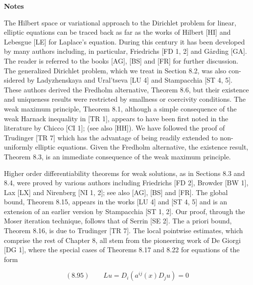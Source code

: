 \noindent \textbf{Notes}

\medskip

The Hilbert space or variational approach to the Dirichlet problem for linear,
elliptic equations can be traced back as far as the works of Hilbert [HI] and
Lebesgue [LE] for Laplace's equation. During this century it has been developed
by many authors including, in particular, Friedrichs [FD 1, 2] and G\aa rding [GA].
The reader is referred to the books [AG], [BS] and [FR] for further discussion.
The generalized Dirichlet problem, which we treat in Section 8.2, was also con-
sidered by Ladyzhenskaya and Ural'tseva [LU 4] and Stampacchia [ST 4, 5].
These authors derived the Fredholm alternative, Theorem 8.6, but their existence
and uniqueness results were restricted by smallness or coercivity conditions. The
weak maximum principle, Theorem 8.1, although a simple consequence of the
weak Harnack inequality in [TR 1], appears to have been first noted in the
literature by Chicco [CI 1]; (see also [HH]). We have followed the proof of
Trudinger [TR 7] which has the advantage of being readily extended to non-
uniformly elliptic equations. Given the Fredholm alternative, the existence result,
Theorem 8.3, is an immediate consequence of the weak maximum principle.



Higher order differentiability theorems for weak solutions, as in Sections 8.3
and 8.4, were proved by various authors including Friedrichs [FD 2], Browder
[BW 1], Lax [LX] and Nirenberg [NI 1, 2]; see also [AG], [BS] and [FR].
The global bound, Theorem 8.15, appears in the works [LU 4] and [ST 4, 5]
and is an extension of an earlier version by Stampacchia [ST 1, 2]. Our proof,
through the Moser iteration technique, follows that of Serrin [SE 2]. The a priori
bound, Theorem 8.16, is due to Trudinger [TR 7].
The local pointwise estimates, which comprise the rest of Chapter 8, all stem
from the pioneering work of De Giorgi [DG 1], where the special cases of Theorems
8.17 and 8.22 for equations of the form

\[
(8.95)\qquad Lu = D_i(a^{ij}(x)D_j u)=0
\]

